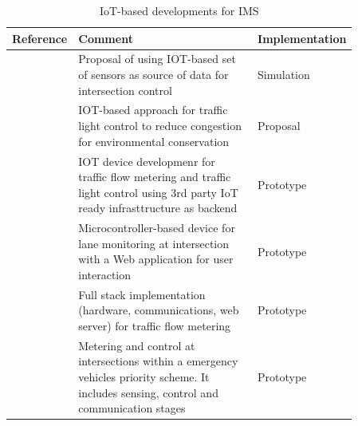 \documentclass[conference]{IEEEtran}
\begin{document}
\begin{table}[tp]
\caption{IoT-based developments for IMS}
\label{iotrev}
\begin{xtabular}{|p{0.12\linewidth}|p{0.52\linewidth}|p{0.22\linewidth}|}

\hline
\textbf{Reference} & \textbf{Comment} & \textbf{Implementation} \\
\hline
{\cite{Tan2011}} &
{Proposal of using IOT-based set of sensors as source of data for intersection control} &
{Simulation}\\

\hline
{\cite{Turcu2012}} &
{IOT-based approach for traffic light control to reduce congestion for environmental conservation } &
{Proposal} \\

\hline
{\cite{Chong2016}} & { IOT device developmenr for traffic flow metering and traffic light control using 3rd party IoT ready infrasttructure as backend} & {Prototype} \\

\hline
{\cite{Talukder2017}} & {Microcontroller-based device for lane monitoring at intersection with a Web application for user interaction} & {Prototype} \\

\hline
\cite{Nagmode2018} & {Full stack implementation (hardware, communications, web server) for traffic flow metering} & {Prototype} \\

\hline
{\cite{Khan2018}} & { Metering and control at intersections within a emergency vehicles priority scheme. It includes sensing, control and communication stages} & {Prototype} \\

\hline

\end{xtabular}
\end{table}










\end{document}
